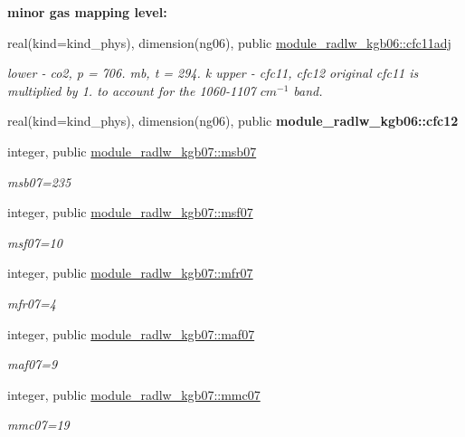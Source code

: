 \begin{Indent}\textbf{ minor gas mapping level\+:}\par
\begin{DoxyCompactItemize}
\item 
real(kind=kind\+\_\+phys), dimension(ng06), public \hyperlink{group__module__radlw__kgbnn_ga8b0813723ba69b1afbe2552f6b730267}{module\+\_\+radlw\+\_\+kgb06\+::cfc11adj}
\begin{DoxyCompactList}\small\item\em lower -\/ co2, p = 706. mb, t = 294. k upper -\/ cfc11, cfc12 original cfc11 is multiplied by 1. to account for the 1060-\/1107 $cm^{-1}$ band. \end{DoxyCompactList}\item 
real(kind=kind\+\_\+phys), dimension(ng06), public {\bfseries module\+\_\+radlw\+\_\+kgb06\+::cfc12}
\item 
integer, public \hyperlink{group__module__radlw__kgbnn_gabba2139dfc5d8551f844f3809c28ce3c}{module\+\_\+radlw\+\_\+kgb07\+::msb07}
\begin{DoxyCompactList}\small\item\em msb07=235 \end{DoxyCompactList}\item 
integer, public \hyperlink{group__module__radlw__kgbnn_ga9310f33501467fbadcf092d71559358b}{module\+\_\+radlw\+\_\+kgb07\+::msf07}
\begin{DoxyCompactList}\small\item\em msf07=10 \end{DoxyCompactList}\item 
integer, public \hyperlink{group__module__radlw__kgbnn_ga0bd5d550553238ae13cbf57423d102c8}{module\+\_\+radlw\+\_\+kgb07\+::mfr07}
\begin{DoxyCompactList}\small\item\em mfr07=4 \end{DoxyCompactList}\item 
integer, public \hyperlink{group__module__radlw__kgbnn_ga21ac454fe21fb07ee555b4106121b2ae}{module\+\_\+radlw\+\_\+kgb07\+::maf07}
\begin{DoxyCompactList}\small\item\em maf07=9 \end{DoxyCompactList}\item 
integer, public \hyperlink{group__module__radlw__kgbnn_ga2d176bec938d9fdcc2369fda91308702}{module\+\_\+radlw\+\_\+kgb07\+::mmc07}
\begin{DoxyCompactList}\small\item\em mmc07=19 \end{DoxyCompactList}\item 

\end{DoxyCompactItemize}
\end{Indent}
